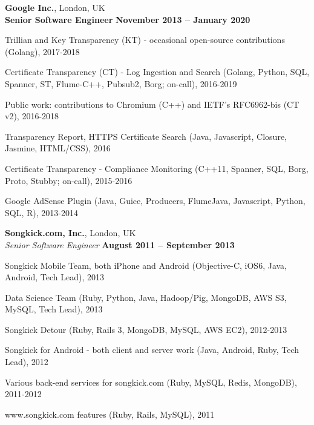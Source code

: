 \documentclass[line]{resume}
\begin{document}
\begin{resume}
    \textbf{Google Inc.}, London, UK \vspace{2mm}\\\vspace{1mm}%
    \textbf{Senior Software Engineer} \hfill \textbf{November 2013 -- January 2020}\vspace{-3mm}\\\vspace{-1mm}%
    \begin{list2}
        \item Trillian and Key Transparency (KT) - occasional open-source contributions (Golang), 2017-2018
        \item Certificate Transparency (CT) - Log Ingestion and Search (Golang, Python, SQL, Spanner, ST, Flume-C++, Pubsub2, Borg; on-call), 2016-2019
        \item Public work: contributions to Chromium (C++) and IETF's RFC6962-bis (CT v2), 2016-2018
        \item Transparency Report, HTTPS Certificate Search (Java, Javascript, Closure, Jasmine, HTML/CSS), 2016
        \item Certificate Transparency - Compliance Monitoring (C++11, Spanner, SQL, Borg, Proto, Stubby; on-call), 2015-2016
        \item Google AdSense Plugin (Java, Guice, Producers, FlumeJava, Javascript, Python, SQL, R), 2013-2014
    \end{list2}\vspace{-1.5mm}

    \textbf{Songkick.com, Inc.}, London, UK \vspace{2mm}\\\vspace{1mm}%
    \textsl{Senior Software Engineer} \hfill \textbf{August 2011 -- September 2013}\vspace{-3mm}\\\vspace{-1mm}%
    \begin{list2}
        \item Songkick Mobile Team, both iPhone and Android (Objective-C, iOS6, Java, Android, Tech Lead), 2013
        \item Data Science Team (Ruby, Python, Java, Hadoop/Pig, MongoDB, AWS S3, MySQL, Tech Lead), 2013
        \item Songkick Detour (Ruby, Rails 3, MongoDB, MySQL, AWS EC2), 2012-2013
        \item Songkick for Android - both client and server work (Java, Android, Ruby, Tech Lead), 2012
        \item Various back-end services for songkick.com (Ruby, MySQL, Redis, MongoDB), 2011-2012
        \item www.songkick.com features (Ruby, Rails, MySQL), 2011
    \end{list2}\vspace{-1.5mm}


\end{resume}
\end{document}
